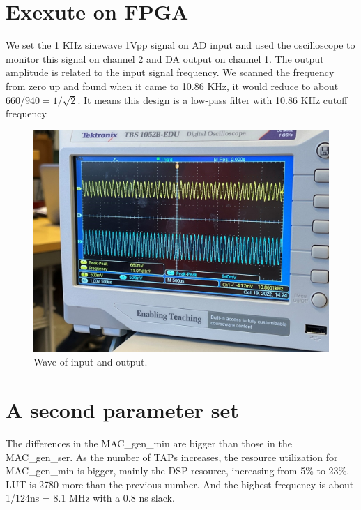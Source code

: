 \documentclass[a4paper]{article}
\begin{document}
\newpage
\section{Exexute on FPGA}
We set the 1 KHz sinewave 1Vpp signal on AD input and used the oscilloscope to monitor this signal on channel 2 and DA output on channel 1. The output amplitude is related to the input signal frequency. We scanned the frequency from zero up and found when it came to 10.86 KHz, it would reduce to about $660/940=1/\sqrt{2}$. It means this design is a low-pass filter with 10.86 KHz cutoff frequency.



\begin{figure}[h]
\centering
\includegraphics[width=1\textwidth]{5.jpg}
\caption{\label{fig:data}Wave of input and output.}
\end{figure}




\newpage
\section{A second parameter set}
The differences in the MAC\_gen\_min are bigger than those in the MAC\_gen\_ser. As the number of TAPs increases, the resource utilization for MAC\_gen\_min is bigger, mainly the DSP resource, increasing from 5\% to 23\%. LUT is 2780 more than the previous number. And the highest frequency is about 1/124ns = 8.1 MHz with a 0.8 ns slack.
\end{document}
